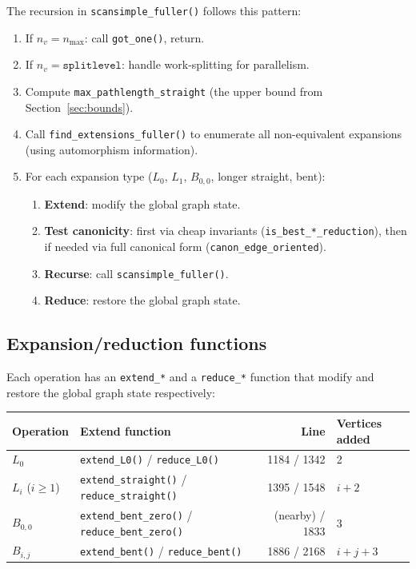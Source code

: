 \documentclass[11pt,a4paper]{article}
\theoremstyle{definition}
\begin{document}
The recursion in \texttt{scansimple\_fuller()} follows this pattern:
\begin{enumerate}[nosep]
  \item If $n_v = n_{\max}$: call \texttt{got\_one()}, return.
  \item If $n_v = \texttt{splitlevel}$: handle work-splitting for parallelism.
  \item Compute \texttt{max\_pathlength\_straight} (the upper bound from
    Section~\ref{sec:bounds}).
  \item Call \texttt{find\_extensions\_fuller()} to enumerate all
    non-equivalent expansions (using automorphism information).
  \item For each expansion type ($L_0$, $L_1$, $B_{0,0}$, longer
    straight, bent):
    \begin{enumerate}[nosep]
      \item \textbf{Extend}: modify the global graph state.
      \item \textbf{Test canonicity}: first via cheap invariants
        (\texttt{is\_best\_*\_reduction}), then if needed via full
        canonical form (\texttt{canon\_edge\_oriented}).
      \item \textbf{Recurse}: call \texttt{scansimple\_fuller()}.
      \item \textbf{Reduce}: restore the global graph state.
    \end{enumerate}
\end{enumerate}

\subsection{Expansion/reduction functions}

Each operation has an \texttt{extend\_*} and a \texttt{reduce\_*} function
that modify and restore the global graph state respectively:

\begin{center}
\begin{tabular}{llrl}
Operation & Extend function & Line & Vertices added \\
\hline
$L_0$      & \texttt{extend\_L0()} / \texttt{reduce\_L0()} & 1184 / 1342 & 2 \\
$L_i$ ($i \ge 1$)  & \texttt{extend\_straight()} / \texttt{reduce\_straight()} & 1395 / 1548 & $i+2$ \\
$B_{0,0}$  & \texttt{extend\_bent\_zero()} / \texttt{reduce\_bent\_zero()} & (nearby) / 1833 & 3 \\
$B_{i,j}$  & \texttt{extend\_bent()} / \texttt{reduce\_bent()} & 1886 / 2168 & $i{+}j{+}3$ \\
\end{tabular}
\end{center}
\end{document}
